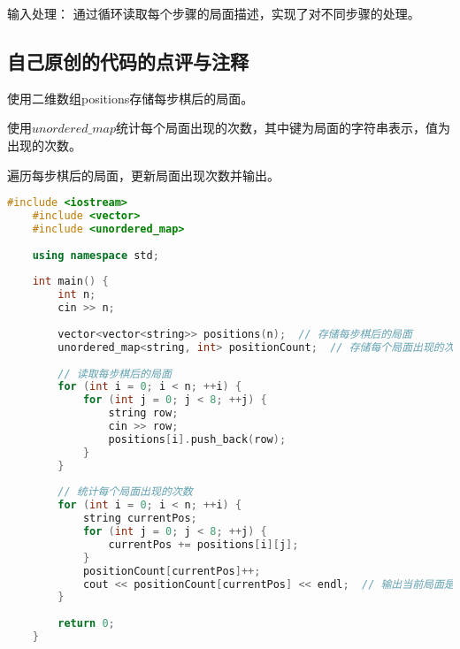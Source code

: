 输入处理： 通过循环读取每个步骤的局面描述，实现了对不同步骤的处理。

\subsection{自己原创的代码的点评与注释}

使用二维数组positions存储每步棋后的局面。

使用$unordered\_map$统计每个局面出现的次数，其中键为局面的字符串表示，值为出现的次数。

遍历每步棋后的局面，更新局面出现次数并输出。

\begin{lstlisting}[language=C++]
    #include <iostream>
    #include <vector>
    #include <unordered_map>
    
    using namespace std;
    
    int main() {
        int n;
        cin >> n;
    
        vector<vector<string>> positions(n);  // 存储每步棋后的局面
        unordered_map<string, int> positionCount;  // 存储每个局面出现的次数
    
        // 读取每步棋后的局面
        for (int i = 0; i < n; ++i) {
            for (int j = 0; j < 8; ++j) {
                string row;
                cin >> row;
                positions[i].push_back(row);
            }
        }
    
        // 统计每个局面出现的次数
        for (int i = 0; i < n; ++i) {
            string currentPos;
            for (int j = 0; j < 8; ++j) {
                currentPos += positions[i][j];
            }
            positionCount[currentPos]++;
            cout << positionCount[currentPos] << endl;  // 输出当前局面是第几次出现
        }
    
        return 0;
    }    
\end{lstlisting}